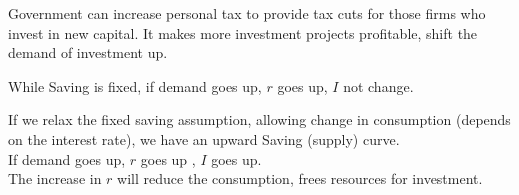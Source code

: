 \documentclass[12pt]{article}
\begin{document}
Government can increase personal tax to provide tax cuts for those firms who invest
in new capital. It makes more investment projects profitable, shift the demand of 
investment up.

While Saving is fixed, if demand goes up, $ r $ goes up, $ I $ not change.
\begin{figure}[H]
\end{figure}


If we relax the fixed saving assumption, allowing change in consumption (depends on
the interest rate), we have an upward Saving (supply) curve.\\
If demand goes up, $ r $ goes up , $ I $ goes up.\\
The increase in $ r $ will reduce the consumption, frees resources for investment.

\begin{figure}[H]
\end{figure}
\end{document}
